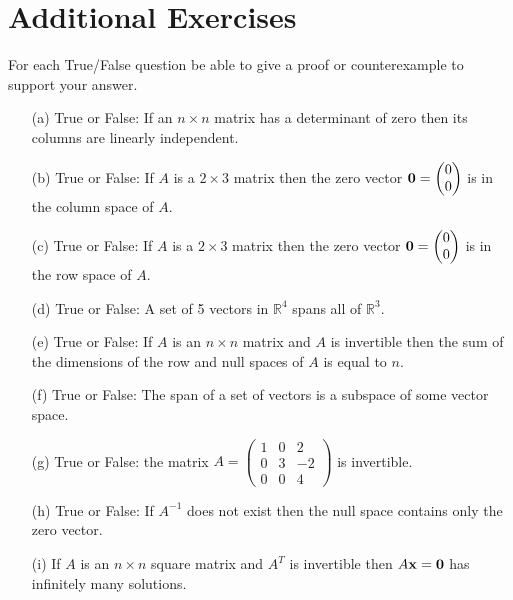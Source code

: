 \newpage\section{Additional Exercises}

\begin{problem}
    For each True/False question be able to give a proof or counterexample to support your
    answer.
    \begin{enumerate}
        \item[(a)] True or False: If an $n \times n$ matrix has a determinant of zero then
            its columns are linearly independent. 
        \item[(b)] True or False: If $A$ is a $2 \times 3$ matrix then the zero vector ${\bf 0} =
            \begin{pmatrix}0\\0\end{pmatrix}$ is in the column space of $A$.
        \item[(c)] True or False: If $A$ is a $2 \times 3$ matrix then the zero vector ${\bf 0} =
            \begin{pmatrix}0\\0\end{pmatrix}$ is in the row space of $A$.
        \item[(d)] True or False: A set of 5 vectors in $\mathbb{R}^4$ spans all of
            $\mathbb{R}^3$. 
        \item[(e)] True or False: If $A$ is an $n \times n$ matrix and $A$ is invertible
            then the sum of the dimensions of the row and null spaces of $A$ is equal to
            $n$. 
        \item[(f)] True or False: The span of a set of vectors is a subspace of some vector
            space.  
        \item[(g)] True or False: the matrix $A = \begin{pmatrix} 1 & 0 & 2 \\ 0 & 3 & -2
                \\ 0 & 0 & 4\end{pmatrix}$ is invertible.  
        \item[(h)] True or False: If $A^{-1}$ does not exist then the null space contains
            only the zero vector. 
        \item[(i)] If $A$ is an $n \times n$ square matrix and $A^T$ is invertible then
            $A{\bf x} = {\bf 0}$ has infinitely many solutions. 
    \end{enumerate}
\end{problem}


